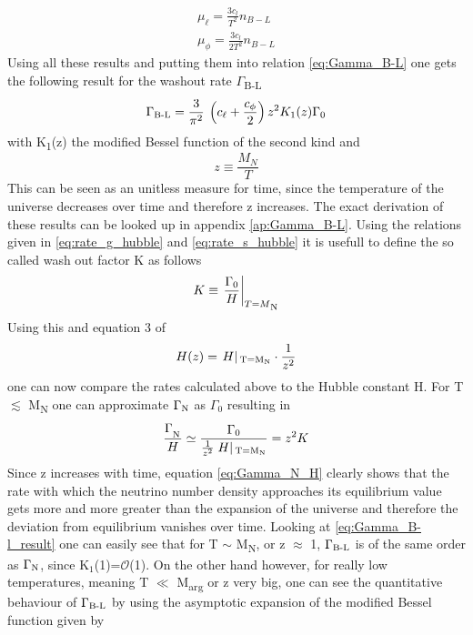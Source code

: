 \begin{align}
\mu_\ell=\frac{3c_l}{T^2}n_{B-L}
\label{eq:chempot_l}
\\
\mu_\phi=\frac{3c_l}{2T^2}n_{B-L}
\label{eq:chempot_phi}
\end{align}
Using all these results and putting them into relation \ref{eq:Gamma_B-L} one gets the following result for the washout rate $\Gamma$\textsubscript{B-L}
\begin{equation}
	\Gamma\textsubscript{B-L}=\frac{3}{\pi^2}\:\left(c_\ell+\frac{c_\phi}{2}\right)z^2K_1(z)\Gamma_0
	\label{eq:Gamma_B-l_result}
\end{equation}
with K\textsubscript{1}(z) the modified Bessel function of the second kind and 
\begin{equation}
	z\equiv\frac{M_N}{T}
\end{equation}
This can be seen as an unitless measure for time, since the temperature of the universe decreases over time and therefore z increases. 
The exact derivation of these results can be looked up in appendix \ref{ap:Gamma_B-L}. \newline
Using the relations given in \ref{eq:rate_g_hubble} and \ref{eq:rate_s_hubble} it is usefull to define the so called wash out factor K as follows
\begin{equation}
	K\equiv\left.\frac{\Gamma_0}{H}\right|_{T=M\textsubscript{N}}
\end{equation}
Using this and equation 3 of \cite{Buchmuller:2004nz}
\begin{equation}
	H(z)=\left.H\right|\textsubscript{T=M\textsubscript{N}}\cdot \frac{1}{z^2}
	\label{eq:H_von_z}
\end{equation}
one can now compare the rates calculated above to the Hubble constant H.\newline
For T $\lesssim$ M\textsubscript{N} one can approximate $\Gamma\textsubscript{N}$ as $\Gamma_0$ resulting in 
\begin{equation}
	\frac{\Gamma_\textsubscript{N}}{H}\simeq\frac{\Gamma_0}{\frac{1}{z^2}\left.H\right|\textsubscript{T=M\textsubscript{N}}}=z^2K
	\label{eq:Gamma_N_H}
\end{equation}
Since z increases with time, equation \ref{eq:Gamma_N_H} clearly shows that the rate with which the neutrino number density approaches its equilibrium value gets more and more greater than the expansion of the universe and therefore the deviation from equilibrium vanishes over time. \newline
Looking at \ref{eq:Gamma_B-l_result} one can easily see that for T $\sim$ M\textsubscript{N}, or z $\approx$ 1, $\Gamma\textsubscript{B-L}$ is of the same order as $\Gamma\textsubscript{N}$, since K$_1$(1)=$\mathcal{O}$(1). On the other hand however, for really low temperatures, meaning T $\ll$ M\textsubscript{arg} or z very big, one can see the quantitative behaviour of $\Gamma\textsubscript{B-L}$ by using the asymptotic expansion of the modified Bessel function given by
